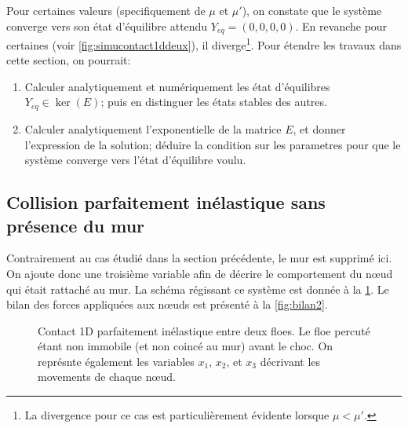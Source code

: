 \noindent Pour certaines valeurs (specifiquement de $\mu$ et $\mu'$), on constate que le système converge vers son état d'équilibre attendu $Y_{eq} = (0,0,0,0)$. En revanche pour certaines (voir \cref{fig:simucontact1ddeux}), il diverge\footnote{La divergence pour ce cas est particulièrement évidente lorsque $\mu < \mu'$.}. Pour étendre les travaux dans cette section, on pourrait:
\begin{enumerate}
    \item Calculer analytiquement et numériquement les état d'équilibres $Y_{eq} \in \ker(E)$; puis en distinguer les états stables des autres.
    \item Calculer analytiquement l'exponentielle de la matrice $E$, et donner l'expression de la solution; déduire la condition sur les parametres pour que le système converge vers l'état d'équilibre voulu.
\end{enumerate} 








\subsection{Collision parfaitement inélastique sans présence du mur}

Contrairement au cas étudié dans la section précédente, le mur est supprimé ici. On ajoute donc une troisième variable afin de décrire le comportement du n\oe{}ud qui était rattaché au mur. La schéma régissant ce système est donnée à la \cref{fig:contact1d2}. Le bilan des forces appliquées aux n\oe{}uds est présenté à la \cref{fig:bilan2}.

\begin{figure}[!h]
    \centering
    \caption{Contact 1D parfaitement inélastique entre deux floes. Le floe percuté étant non immobile (et non coincé au mur) avant le choc. On représnte également les variables $x_1$, $x_2$, et $x_3$ décrivant les movements de chaque n\oe{}ud.}
    \label{fig:contact1d2}
\end{figure}

